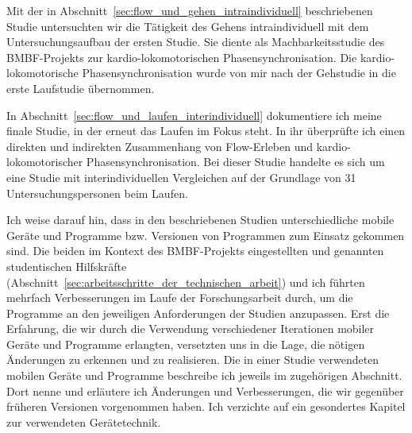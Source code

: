 Mit der in Abschnitt~\ref{sec:flow_und_gehen_intraindividuell} beschriebenen Studie untersuchten wir die Tätigkeit des Gehens intraindividuell mit dem Untersuchungsaufbau der ersten Studie. Sie diente als Machbarkeitsstudie des \acs{BMBF}-Projekts zur kardio-lokomotorischen Phasensynchronisation. Die kardio-lokomotorische Phasensynchronisation wurde von mir nach der Gehstudie in die erste Laufstudie übernommen. 

In Abschnitt~\ref{sec:flow_und_laufen_interindividuell} dokumentiere ich meine finale Studie, in der erneut das Laufen im Fokus steht. In ihr überprüfte ich einen direkten und indirekten Zusammenhang von Flow-Erleben und kardio-lokomotorischer Phasensynchronisation. Bei dieser Studie handelte es sich um eine Studie mit interindividuellen Vergleichen auf der Grundlage von 31 Untersuchungspersonen beim Laufen. 

Ich weise darauf hin, dass in den beschriebenen Studien unterschiedliche mobile Geräte und Programme bzw. Versionen von Programmen zum Einsatz gekommen sind. Die beiden im Kontext des \acs{BMBF}-Projekts eingestellten und genannten studentischen Hilfskräfte (Abschnitt~\ref{sec:arbeitsschritte_der_technischen_arbeit}) und ich führten mehrfach Verbesserungen im Laufe der Forschungsarbeit durch, um die Programme an den jeweiligen Anforderungen der Studien anzupassen. Erst die Erfahrung, die wir durch die Verwendung verschiedener Iterationen mobiler Geräte und Programme erlangten, versetzten uns in die Lage, die nötigen Änderungen zu erkennen und zu realisieren. Die in einer Studie verwendeten mobilen Geräte und Programme beschreibe ich jeweils im zugehörigen Abschnitt. Dort nenne und erläutere ich Änderungen und Verbesserungen, die wir gegenüber früheren Versionen vorgenommen haben. Ich verzichte auf ein gesondertes Kapitel zur verwendeten Gerätetechnik.
